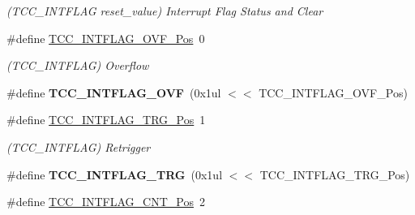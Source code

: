 \begin{DoxyCompactItemize}
\begin{DoxyCompactList}\small\item\em (T\+C\+C\+\_\+\+I\+N\+T\+F\+L\+A\+G reset\+\_\+value) Interrupt Flag Status and Clear \end{DoxyCompactList}\item 
\hypertarget{group___s_a_m_l21___t_c_c_gaaf296ad538701f9f401f794916f67752}{}\#define \hyperlink{group___s_a_m_l21___t_c_c_gaaf296ad538701f9f401f794916f67752}{T\+C\+C\+\_\+\+I\+N\+T\+F\+L\+A\+G\+\_\+\+O\+V\+F\+\_\+\+Pos}~0\label{group___s_a_m_l21___t_c_c_gaaf296ad538701f9f401f794916f67752}

\begin{DoxyCompactList}\small\item\em (T\+C\+C\+\_\+\+I\+N\+T\+F\+L\+A\+G) Overflow \end{DoxyCompactList}\item 
\hypertarget{group___s_a_m_l21___t_c_c_ga1ddf814f0de7acb1c92695095e2ff25e}{}\#define {\bfseries T\+C\+C\+\_\+\+I\+N\+T\+F\+L\+A\+G\+\_\+\+O\+V\+F}~(0x1ul $<$$<$ T\+C\+C\+\_\+\+I\+N\+T\+F\+L\+A\+G\+\_\+\+O\+V\+F\+\_\+\+Pos)\label{group___s_a_m_l21___t_c_c_ga1ddf814f0de7acb1c92695095e2ff25e}

\item 
\hypertarget{group___s_a_m_l21___t_c_c_ga36a06c0dca3c6aadf0bb571dbca555ee}{}\#define \hyperlink{group___s_a_m_l21___t_c_c_ga36a06c0dca3c6aadf0bb571dbca555ee}{T\+C\+C\+\_\+\+I\+N\+T\+F\+L\+A\+G\+\_\+\+T\+R\+G\+\_\+\+Pos}~1\label{group___s_a_m_l21___t_c_c_ga36a06c0dca3c6aadf0bb571dbca555ee}

\begin{DoxyCompactList}\small\item\em (T\+C\+C\+\_\+\+I\+N\+T\+F\+L\+A\+G) Retrigger \end{DoxyCompactList}\item 
\hypertarget{group___s_a_m_l21___t_c_c_gae22e425fbd887c7fc1b4f0572ee8e66d}{}\#define {\bfseries T\+C\+C\+\_\+\+I\+N\+T\+F\+L\+A\+G\+\_\+\+T\+R\+G}~(0x1ul $<$$<$ T\+C\+C\+\_\+\+I\+N\+T\+F\+L\+A\+G\+\_\+\+T\+R\+G\+\_\+\+Pos)\label{group___s_a_m_l21___t_c_c_gae22e425fbd887c7fc1b4f0572ee8e66d}

\item 
\hypertarget{group___s_a_m_l21___t_c_c_ga3d2c5e6e554a9c22ada8de471ff70f76}{}\#define \hyperlink{group___s_a_m_l21___t_c_c_ga3d2c5e6e554a9c22ada8de471ff70f76}{T\+C\+C\+\_\+\+I\+N\+T\+F\+L\+A\+G\+\_\+\+C\+N\+T\+\_\+\+Pos}~2\label{group___s_a_m_l21___t_c_c_ga3d2c5e6e554a9c22ada8de471ff70f76}


\end{DoxyCompactItemize}
